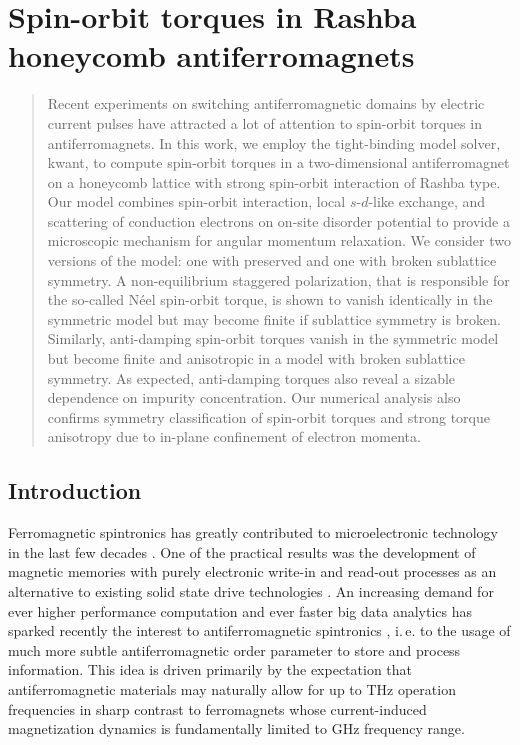 \chapter{Spin-orbit torques in Rashba honeycomb antiferromagnets} %
\begin{abstract}
Recent experiments on switching antiferromagnetic domains by electric current pulses have attracted a lot of attention to spin-orbit torques in antiferromagnets. In this work, we employ the tight-binding model solver, kwant,  to compute spin-orbit torques in a two-dimensional antiferromagnet on a honeycomb lattice with strong spin-orbit interaction of Rashba type. Our model combines spin-orbit interaction, local $s$-$d$-like exchange, and scattering of conduction electrons on on-site disorder potential to provide a microscopic mechanism for angular momentum relaxation. We consider two versions of the model: one with preserved and one with broken sublattice symmetry. A non-equilibrium staggered polarization, that is responsible for the so-called N\'eel spin-orbit torque, is shown to vanish identically in the symmetric model but may become finite if sublattice symmetry is broken. Similarly, anti-damping spin-orbit torques vanish in the symmetric model but become finite and anisotropic in a model with broken sublattice symmetry. As expected, anti-damping torques also reveal a sizable dependence on impurity concentration. Our numerical analysis also confirms symmetry classification of spin-orbit torques and strong torque anisotropy due to in-plane confinement of electron momenta. 
\end{abstract}


\section{Introduction}

Ferromagnetic spintronics has greatly contributed to microelectronic technology in the last few decades \cite{Bader2010, Sinova2012, Bhatti2017}. One of the practical results was the development of magnetic memories with purely electronic write-in and read-out processes as an alternative to existing solid state drive technologies \cite{Kent2015, Sato2018}. An increasing demand for ever higher performance computation and ever faster big data analytics has sparked recently the interest to antiferromagnetic spintronics \cite{MacDonald2011, Gomonay2014, Wadley2016, Jungwirth2016AFMreview, Baltz2018, Jungwirth2018, Hoffman2018}, i.\,e. to the usage of much more subtle antiferromagnetic order parameter to store and process information. This idea is driven primarily by the expectation that antiferromagnetic materials may naturally allow for up to THz operation frequencies \cite{Gomonay2016AFM, Olejnik2018, Jungwirth2018} in sharp contrast to ferromagnets whose current-induced magnetization dynamics is fundamentally limited to GHz frequency range. 
  
